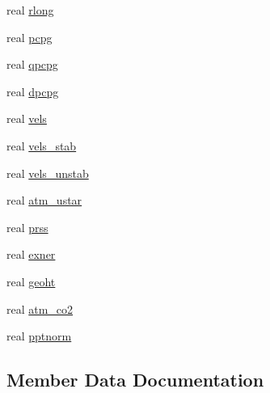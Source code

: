 \begin{DoxyCompactItemize}
\item 
real \hyperlink{structmet__driver__coms_1_1met__driv__state_a97b5a0d3e0d91625cc9f7ce5466250d3}{rlong}
\item 
real \hyperlink{structmet__driver__coms_1_1met__driv__state_a6743d2024c42fd16c0bb66a27aee7dab}{pcpg}
\item 
real \hyperlink{structmet__driver__coms_1_1met__driv__state_af1d92bf111e5ecc9504425bb9b686510}{qpcpg}
\item 
real \hyperlink{structmet__driver__coms_1_1met__driv__state_a89b39d6539ca58bb0d67f72f0a9cca3a}{dpcpg}
\item 
real \hyperlink{structmet__driver__coms_1_1met__driv__state_a2f1468290cf4c5191ff3305516f403b4}{vels}
\item 
real \hyperlink{structmet__driver__coms_1_1met__driv__state_aea2f12c370f025cc899515c9043dbdb9}{vels\+\_\+stab}
\item 
real \hyperlink{structmet__driver__coms_1_1met__driv__state_a5237ae89349cfee1060065ed728b8bb1}{vels\+\_\+unstab}
\item 
real \hyperlink{structmet__driver__coms_1_1met__driv__state_a2ae1bf578a610d259dc6312cfe52bd6c}{atm\+\_\+ustar}
\item 
real \hyperlink{structmet__driver__coms_1_1met__driv__state_a06b520bcea3424567bf379011fe40e73}{prss}
\item 
real \hyperlink{structmet__driver__coms_1_1met__driv__state_ac473e9c3fd6e4d935a49ba24ef15d26b}{exner}
\item 
real \hyperlink{structmet__driver__coms_1_1met__driv__state_a511aa6dfb471f836dbe7e0e0e6124d3e}{geoht}
\item 
real \hyperlink{structmet__driver__coms_1_1met__driv__state_ab05d25010c91731e9503dbd6a618dd95}{atm\+\_\+co2}
\item 
real \hyperlink{structmet__driver__coms_1_1met__driv__state_a940ce4816665900d5de54bd07c5b87ec}{pptnorm}
\end{DoxyCompactItemize}


\subsection{Member Data Documentation}
\mbox{\label{structmet__driver__coms_1_1met__driv__state_ab05d25010c91731e9503dbd6a618dd95}} 
